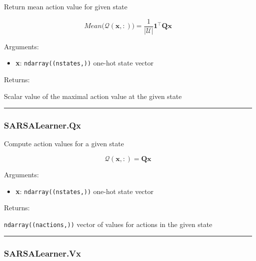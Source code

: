 Return mean action value for given state

\[
Mean \big(\mathcal Q(\mathbf x, :)\big) = \frac{1}{|\mathcal U|} \mathbf 1^\top \mathbf Q \mathbf x
\]

Arguments:

\begin{itemize}
\tightlist
\item
  \textbf{x}: \texttt{ndarray((nstates,))} one-hot state vector
\end{itemize}

Returns:

Scalar value of the maximal action value at the given state

\begin{center}\rule{0.5\linewidth}{\linethickness}\end{center}

\subsubsection{SARSALearner.Qx}\label{sarsalearner.qx}

\begin{Shaded}
\begin{Highlighting}[]
\end{Highlighting}
\end{Shaded}

Compute action values for a given state

\[
\mathcal Q(\mathbf x, :) = \mathbf Q \mathbf x
\]

Arguments:

\begin{itemize}
\tightlist
\item
  \textbf{x}: \texttt{ndarray((nstates,))} one-hot state vector
\end{itemize}

Returns:

\texttt{ndarray((nactions,))} vector of values for actions in the given
state

\begin{center}\rule{0.5\linewidth}{\linethickness}\end{center}

\subsubsection{SARSALearner.Vx}\label{sarsalearner.vx}

